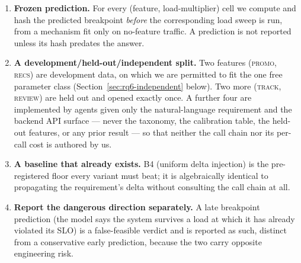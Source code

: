 \documentclass[journal, 10pt]{IEEEtran}
\begin{document}
\begin{enumerate}
    \item \textbf{Frozen prediction.} For every (feature, load-multiplier)
    cell we compute and hash the predicted breakpoint \emph{before} the
    corresponding load sweep is run, from a mechanism fit only on
    no-feature traffic. A prediction is not reported unless its hash
    predates the answer.
    \item \textbf{A development/held-out/independent split.} Two features
    (\textsc{promo}, \textsc{recs}) are development data, on which we are
    permitted to fit the one free parameter class (Section~\ref{sec:rq6-independent}
    below). Two more (\textsc{track}, \textsc{review}) are held out and
    opened exactly once. A further four are implemented by agents given only
    the natural-language requirement and the backend API surface --- never
    the taxonomy, the calibration table, the held-out features, or any prior
    result --- so that neither the call chain nor its per-call cost is
    authored by us.
    \item \textbf{A baseline that already exists.} B4 (uniform delta
    injection) is the pre-registered floor every variant must beat; it is
    algebraically identical to propagating the requirement's delta without
    consulting the call chain at all.
    \item \textbf{Report the dangerous direction separately.} A late
    breakpoint prediction (the model says the system survives a load at
    which it has already violated its SLO) is a false-feasible verdict and
    is reported as such, distinct from a conservative early prediction,
    because the two carry opposite engineering risk.
\end{enumerate}
\end{document}
